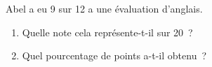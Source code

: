 \documentclass[exercice]{thedocument}%
\begin{document}
%
Abel a eu 9 sur 12 a une évaluation d'anglais.\par\medskip
\begin{enumerate}
    \item Quelle note cela représente-t-il sur 20~?
    \item Quel pourcentage de points a-t-il obtenu~?
\end{enumerate}
\end{document}
